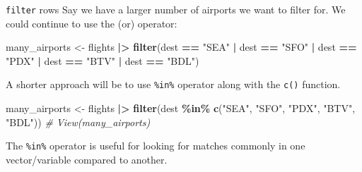 \documentclass[
  ignorenonframetext,
]{beamer}
\newenvironment{Shaded}{\begin{snugshade}}{\end{snugshade}}
\newcommand{\CommentTok}[1]{\textcolor[rgb]{0.56,0.35,0.01}{\textit{#1}}}
\newcommand{\FunctionTok}[1]{\textcolor[rgb]{0.13,0.29,0.53}{\textbf{#1}}}
\newcommand{\NormalTok}[1]{#1}
\newcommand{\OtherTok}[1]{\textcolor[rgb]{0.56,0.35,0.01}{#1}}
\newcommand{\SpecialCharTok}[1]{\textcolor[rgb]{0.81,0.36,0.00}{\textbf{#1}}}
\newcommand{\StringTok}[1]{\textcolor[rgb]{0.31,0.60,0.02}{#1}}
\begin{document}
\begin{frame}[fragile]{\texttt{filter} rows}
\label{filter-rows-5}
Say we have a larger number of airports we want to filter for. We could
continue to use the \texttt{\textbar{}} (or) operator:

\normalsize

\begin{Shaded}
\begin{Highlighting}[]
\NormalTok{many\_airports }\OtherTok{\textless{}{-}}\NormalTok{ flights }\SpecialCharTok{|\textgreater{}} 
  \FunctionTok{filter}\NormalTok{(dest }\SpecialCharTok{==} \StringTok{"SEA"} \SpecialCharTok{|}\NormalTok{ dest }\SpecialCharTok{==} \StringTok{"SFO"} \SpecialCharTok{|}\NormalTok{ dest }\SpecialCharTok{==} \StringTok{"PDX"} \SpecialCharTok{|} 
\NormalTok{         dest }\SpecialCharTok{==} \StringTok{"BTV"} \SpecialCharTok{|}\NormalTok{ dest }\SpecialCharTok{==} \StringTok{"BDL"}\NormalTok{)}
\end{Highlighting}
\end{Shaded}

\normalsize

A shorter approach will be to use \texttt{\%in\%} operator along with
the \texttt{c()} function.

\normalsize

\begin{Shaded}
\begin{Highlighting}[]
\NormalTok{many\_airports }\OtherTok{\textless{}{-}}\NormalTok{ flights }\SpecialCharTok{|\textgreater{}} 
  \FunctionTok{filter}\NormalTok{(dest }\SpecialCharTok{\%in\%} \FunctionTok{c}\NormalTok{(}\StringTok{"SEA"}\NormalTok{, }\StringTok{"SFO"}\NormalTok{, }\StringTok{"PDX"}\NormalTok{, }\StringTok{"BTV"}\NormalTok{, }\StringTok{"BDL"}\NormalTok{))}
\CommentTok{\# View(many\_airports)}
\end{Highlighting}
\end{Shaded}

\normalsize

The \texttt{\%in\%} operator is useful for looking for matches commonly
in one vector/variable compared to another.
\end{frame}
\end{document}

